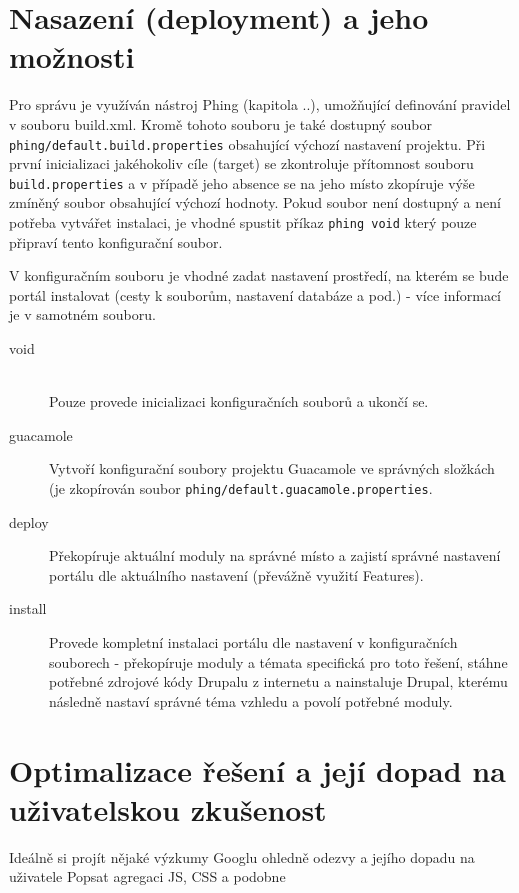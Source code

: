 \section{Nasazení (deployment) a jeho možnosti}

Pro správu %
je využíván nástroj Phing (kapitola ..), umožňující definování pravidel v souboru build.xml. Kromě tohoto souboru je také dostupný soubor \texttt{phing/default.build.properties} obsahující výchozí nastavení projektu. Při první inicializaci jakéhokoliv cíle (target) se zkontroluje přítomnost souboru \texttt{build.properties} a v případě jeho absence se na jeho místo zkopíruje výše zmíněný soubor obsahující výchozí hodnoty. Pokud soubor není dostupný a není potřeba vytvářet instalaci, je vhodné spustit příkaz \texttt{phing void} který pouze připraví tento konfigurační soubor. 

V konfiguračním souboru je vhodné zadat nastavení prostředí, na kterém se bude portál instalovat (cesty k souborům, nastavení databáze a pod.) - více informací je v samotném souboru.

\begin{description}
  \item[void] \hfill \\
  Pouze provede inicializaci konfiguračních souborů a ukončí se.  
  \item[guacamole] 
  Vytvoří konfigurační soubory projektu Guacamole ve správných složkách (je zkopírován soubor \texttt{phing/default.guacamole.properties}.
  \item[deploy]
  Překopíruje aktuální moduly na správné místo a zajistí správné nastavení portálu dle aktuálního nastavení (převážně využití Features).
  \item[install]
  Provede kompletní instalaci portálu dle nastavení v konfiguračních souborech - překopíruje moduly a témata specifická pro toto řešení, stáhne potřebné zdrojové kódy Drupalu z internetu a nainstaluje Drupal, kterému následně nastaví správné téma vzhledu a povolí potřebné moduly.
\end{description}

\section{Optimalizace řešení a její dopad na uživatelskou zkušenost}
Ideálně si projít nějaké výzkumy Googlu ohledně odezvy a jejího dopadu na uživatele
Popsat agregaci JS, CSS a podobne 
\cite{website:drupal:optimizing}


